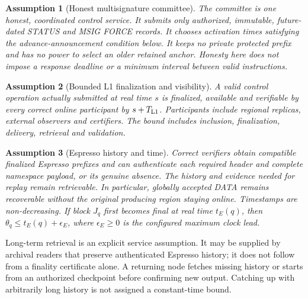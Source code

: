 \documentclass[11pt,a4paper]{article}
\newtheorem{assumption}[assumption]{Assumption}
\begin{document}
\begin{assumption}[Honest multisignature committee]
\label{ass:committee}
The committee is one honest, coordinated control service. It submits
only authorized, immutable, future-dated STATUS and MSIG FORCE
records. It chooses activation times satisfying the advance-announcement
condition below. It keeps no private protected prefix and has no power
to select an older retained anchor. Honesty here does not impose a
response deadline or a minimum interval between valid instructions.
\end{assumption}

\begin{assumption}[Bounded L1 finalization and visibility]
\label{ass:monitor}
A valid control operation actually submitted at real time $s$ is
finalized, available and verifiable by every correct online participant
by $s+T_{\rm L1}$. Participants include regional replicas, external
observers and certifiers. The bound includes inclusion, finalization,
delivery, retrieval and validation.
\end{assumption}

\begin{assumption}[Espresso history and time]
\label{ass:espresso}
Correct verifiers obtain compatible finalized Espresso prefixes and
can authenticate each required header and complete namespace payload,
or its genuine absence. The history and evidence needed for replay remain
retrievable. In particular, globally accepted DATA remains recoverable
without the original producing region staying online. Timestamps are
non-decreasing. If block $J_q$ first becomes final at real time $t_E(q)$,
then $\theta_q\le t_E(q)+\epsilon_E$, where $\epsilon_E\ge0$ is the
configured maximum clock lead.
\end{assumption}
Long-term retrieval is an explicit service assumption. It may be supplied
by archival readers that preserve authenticated Espresso history; it does
not follow from a finality certificate alone. A returning node fetches
missing history or starts from an authorized checkpoint before confirming
new output. Catching up with arbitrarily long history is not assigned a
constant-time bound.
\end{document}
